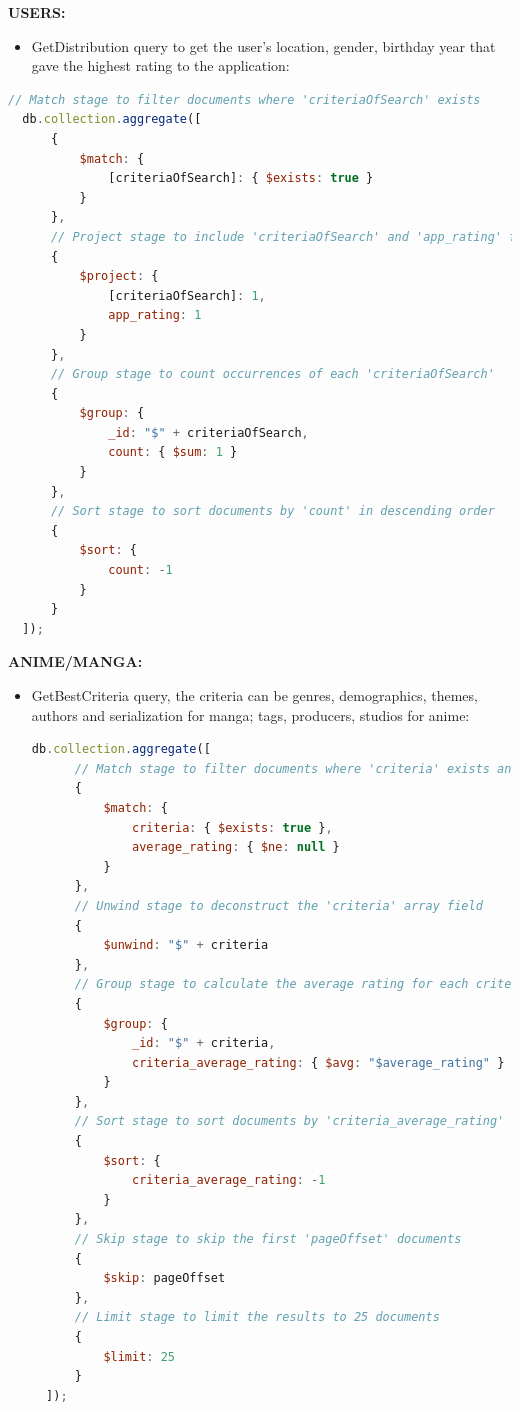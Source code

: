 \textbf{USERS:}
\begin{itemize}
  \item GetDistribution query to get the user's location, gender, birthday year that gave the highest rating to the application:
  
\end{itemize}
\begin{lstlisting}[language=JavaScript, caption=GetDistribution]
  // Match stage to filter documents where 'criteriaOfSearch' exists
  db.collection.aggregate([
      {
          $match: {
              [criteriaOfSearch]: { $exists: true }
          }
      },
      // Project stage to include 'criteriaOfSearch' and 'app_rating' fields
      {
          $project: {
              [criteriaOfSearch]: 1,
              app_rating: 1
          }
      },
      // Group stage to count occurrences of each 'criteriaOfSearch'
      {
          $group: {
              _id: "$" + criteriaOfSearch,
              count: { $sum: 1 }
          }
      },
      // Sort stage to sort documents by 'count' in descending order
      {
          $sort: {
              count: -1
          }
      }
  ]);
  \end{lstlisting}
  


\textbf{ANIME/MANGA:}

\begin{itemize}

\item GetBestCriteria query, the criteria can be genres, demographics, themes, authors and serialization for manga; tags, producers, studios for anime:
\begin{lstlisting}[language=JavaScript, caption=GetBestCriteria]
  db.collection.aggregate([
      // Match stage to filter documents where 'criteria' exists and 'average_rating' is not null
      {
          $match: {
              criteria: { $exists: true },
              average_rating: { $ne: null }
          }
      },
      // Unwind stage to deconstruct the 'criteria' array field
      {
          $unwind: "$" + criteria
      },
      // Group stage to calculate the average rating for each criteria
      {
          $group: {
              _id: "$" + criteria,
              criteria_average_rating: { $avg: "$average_rating" }
          }
      },
      // Sort stage to sort documents by 'criteria_average_rating' in descending order
      {
          $sort: {
              criteria_average_rating: -1
          }
      },
      // Skip stage to skip the first 'pageOffset' documents
      {
          $skip: pageOffset
      },
      // Limit stage to limit the results to 25 documents
      {
          $limit: 25
      }
  ]);
  \end{lstlisting}

\end{itemize}

